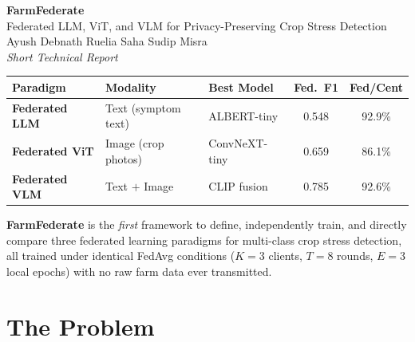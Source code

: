 \documentclass[11pt,a4paper]{article}
\begin{document}
\noindent\colorbox{greendark}{%
  \parbox{\dimexpr\linewidth-2\fboxsep}{%
    \vspace{8pt}
    \centering
    {\Huge\bfseries\color{white} FarmFederate}\\[5pt]
    {\large\color{green!70!white}
      Federated LLM, ViT, and VLM for Privacy-Preserving Crop Stress Detection}\\[5pt]
    {\normalsize\color{white!80!green}
      Ayush Debnath \quad Ruelia Saha \quad Sudip Misra}\\[3pt]
    {\small\itshape\color{white!60!green} Short Technical Report}\\[8pt]
  }%
}

\vspace{0.7cm}

\begin{center}
\renewcommand{\arraystretch}{1.45}
\begin{tabular}{>{\bfseries}lllcc}
\toprule
\textbf{Paradigm} & \textbf{Modality} & \textbf{Best Model} & \textbf{Fed.\ F1} & \textbf{Fed/Cent} \\
\midrule
\rowcolor{llmlight}
\textcolor{llmblue}{Federated LLM} & Text (symptom text) & ALBERT-tiny & 0.548 & 92.9\% \\
\rowcolor{vitlight}
\textcolor{vitgreen}{Federated ViT} & Image (crop photos) & ConvNeXT-tiny & 0.659 & 86.1\% \\
\rowcolor{vlmlight}
\textcolor{vlmred}{Federated VLM}  & Text $+$ Image      & CLIP fusion  & 0.785 & 92.6\% \\
\bottomrule
\end{tabular}
\end{center}

\vspace{0.2cm}
\noindent\textbf{FarmFederate} is the \emph{first} framework to define, independently train, and
directly compare three federated learning paradigms for multi-class crop stress detection,
all trained under identical FedAvg conditions ($K{=}3$ clients, $T{=}8$ rounds, $E{=}3$ local
epochs) with no raw farm data ever transmitted.

\section{The Problem}
\end{document}
